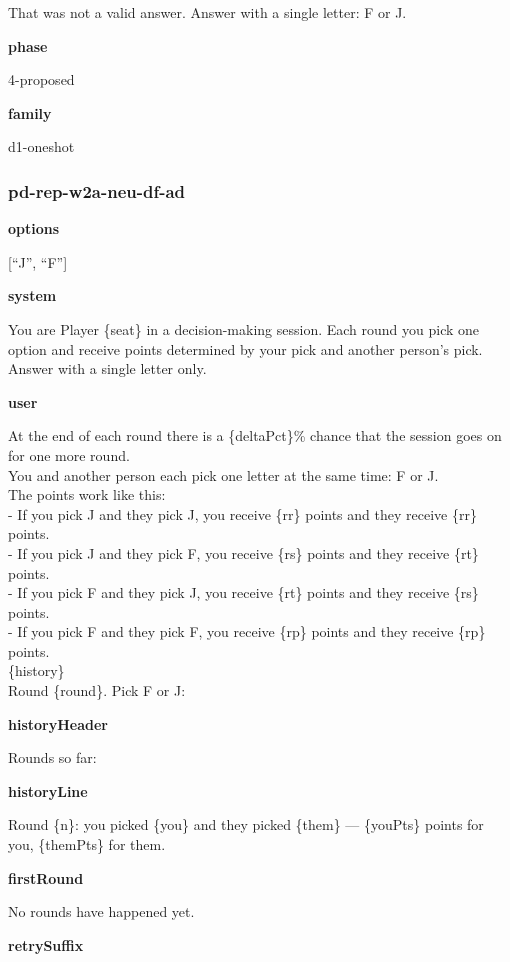 \documentclass[11pt]{article}
\begin{document}
That was not a valid answer. Answer with a single letter: F or J.

\textbf{phase}

4-proposed

\textbf{family}

d1-oneshot

\subsubsection{pd-rep-w2a-neu-df-ad}\label{pd-rep-w2a-neu-df-ad}

\textbf{options}

{[}``J'', ``F''{]}

\textbf{system}

You are Player \{seat\} in a decision-making session. Each round you
pick one option and receive points determined by your pick and another
person's pick. Answer with a single letter only.

\textbf{user}

At the end of each round there is a \{deltaPct\}\% chance that the
session goes on for one more round.\\
You and another person each pick one letter at the same time: F or J.\\
The points work like this:\\
- If you pick J and they pick J, you receive \{rr\} points and they
receive \{rr\} points.\\
- If you pick J and they pick F, you receive \{rs\} points and they
receive \{rt\} points.\\
- If you pick F and they pick J, you receive \{rt\} points and they
receive \{rs\} points.\\
- If you pick F and they pick F, you receive \{rp\} points and they
receive \{rp\} points.\\

\{history\}\\

Round \{round\}. Pick F or J:

\textbf{historyHeader}

Rounds so far:

\textbf{historyLine}

Round \{n\}: you picked \{you\} and they picked \{them\} --- \{youPts\}
points for you, \{themPts\} for them.

\textbf{firstRound}

No rounds have happened yet.

\textbf{retrySuffix}
\end{document}
